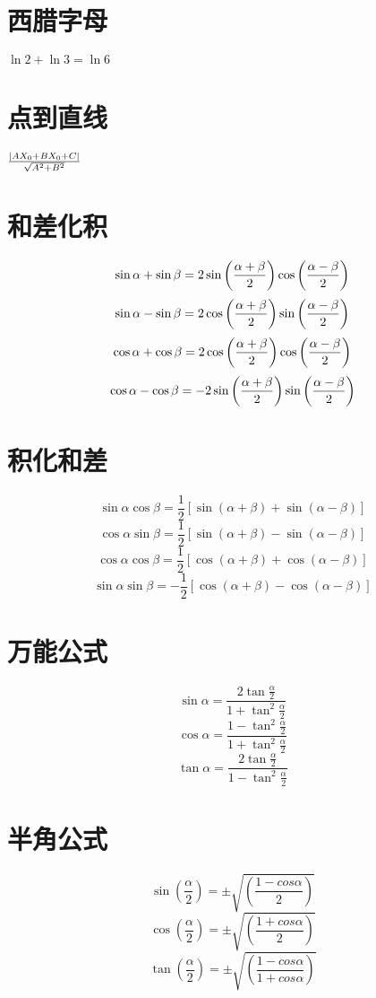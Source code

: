 \documentclass[UTF8]{ctexart}
\begin{document}
\section{西腊字母}

 $\ln2+ \ln3 = \ln6$
\section{点到直线}
$ {\left |{AX_0+BX_0+C} \right |} \over \sqrt{A^2+B^2} $

\section{和差化积}
$$ \sin \alpha + \sin \beta = 2 \sin { \left ( {\alpha + \beta } \over 2 \right ) } \cos \left ( {\alpha - \beta } \over 2 \right ) $$
$$\sin \alpha - \sin \beta = 2 \cos { \left ( {\alpha + \beta } \over 2 \right ) } \sin \left ( {\alpha - \beta } \over 2 \right ) $$
$$ \cos \alpha + \cos \beta = 2 \cos { \left ( {\alpha + \beta } \over 2 \right ) } \cos \left ( {\alpha - \beta } \over 2 \right )$$
$$ \cos \alpha - \cos \beta = -2 \sin { \left ( {\alpha + \beta } \over 2 \right ) } \sin \left ( {\alpha - \beta } \over 2 \right )$$

\section{积化和差}
$$ \sin \alpha \cos \beta = \frac{1}{2} \left [ \sin(\alpha+\beta)+\sin(\alpha-\beta) \right ]$$
$$ \cos \alpha \sin \beta = \frac{1}{2} \left [ \sin(\alpha+\beta)-\sin(\alpha-\beta) \right ]$$
$$ \cos \alpha \cos \beta = \frac{1}{2} \left [ \cos(\alpha+\beta)+\cos(\alpha-\beta) \right ]$$
$$ \sin \alpha \sin \beta =- \frac{1}{2} \left [ \cos(\alpha+\beta)-\cos(\alpha-\beta) \right ]$$

\section{万能公式}
$$ \sin\alpha=\frac{2\tan \frac{\alpha}{2}}{1+\tan^2 \frac{\alpha}{2}}$$
$$ \cos \alpha =\frac {1-\tan^2\frac{\alpha}{2}}{1+\tan^2\frac{\alpha}{2}}$$
$$ \tan\alpha=\frac{2\tan \frac{\alpha}{2}}{1-\tan^2 \frac{\alpha}{2}}$$

\section{半角公式}
$$ \sin \left(\frac{\alpha}{2} \right)=\pm \sqrt{\left(\frac{1-cos \alpha}{2}\right)}$$
$$ \cos \left(\frac{\alpha}{2} \right)=\pm \sqrt{\left(\frac{1+cos \alpha}{2}\right)}$$
$$ \tan \left(\frac{\alpha}{2} \right)=\pm \sqrt{\left(\frac{1-cos \alpha}{1+cos \alpha}\right)}$$
\end{document}
